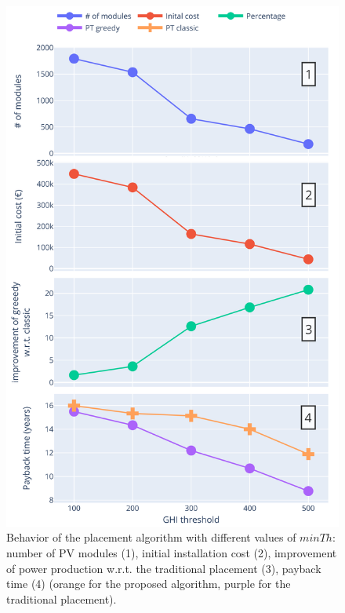 \begin{figure}[!tbp]
\centering
\includegraphics[width=\linewidth]{images/stacked_annotated2.png}\vspace{-0.4cm}
\caption{Behavior of the placement algorithm with different values of $minTh$: number of PV modules (1), initial installation cost (2), improvement of power production w.r.t. the traditional placement (3), payback time (4) (orange for the proposed algorithm, purple for the traditional placement).}
\label{fig:production}
\end{figure}
